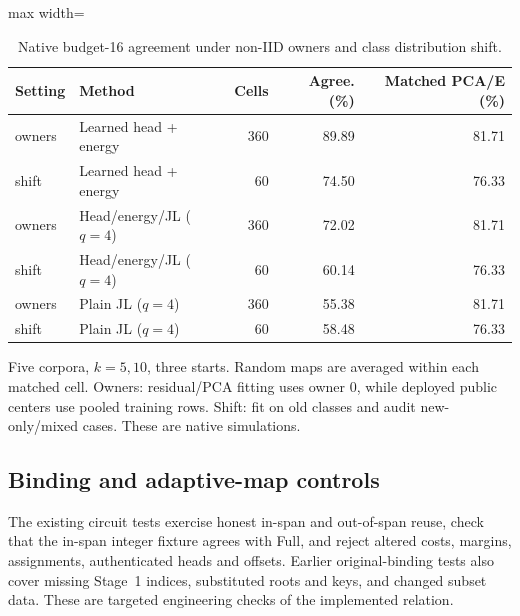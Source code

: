 \documentclass[5p,times,twocolumn]{elsarticle}
\theoremstyle{plain}
\theoremstyle{definition}
\theoremstyle{remark}
\begin{document}
\par\endgroup
\begingroup\color{RevisionGreen}
\begin{table}[tp]\color{RevisionGreen}
\caption{Native budget-16 agreement under non-IID owners and class distribution shift.}\label{tab:reuse-shift}
\centering\small
\begin{adjustbox}{max width=\textwidth}
\begin{tabular}{@{}llrrr@{}}
\toprule
Setting & Method & Cells & Agree. (\%) & Matched PCA/E (\%) \\
\midrule
owners & Learned head + energy & 360 & 89.89 & 81.71 \\
shift & Learned head + energy & 60 & 74.50 & 76.33 \\
owners & Head/energy/JL ($q=4$) & 360 & 72.02 & 81.71 \\
shift & Head/energy/JL ($q=4$) & 60 & 60.14 & 76.33 \\
owners & Plain JL ($q=4$) & 360 & 55.38 & 81.71 \\
shift & Plain JL ($q=4$) & 60 & 58.48 & 76.33 \\
\bottomrule
\end{tabular}
\end{adjustbox}
\par\smallskip\begin{minipage}{0.98\textwidth}\footnotesize Five corpora, $k=5,10$, three starts. Random maps are averaged within each matched cell. Owners: residual/PCA fitting uses owner 0, while deployed public centers use pooled training rows. Shift: fit on old classes and audit new-only/mixed cases. These are native simulations.\end{minipage}
\end{table}


\par\endgroup


\subsection{\textcolor{RevisionGreen}{Binding and adaptive-map controls}}
\begingroup\color{RevisionGreen}
The existing circuit tests exercise honest in-span and out-of-span reuse, check that the in-span integer fixture agrees with Full, and reject altered costs, margins, assignments, authenticated heads and offsets. Earlier original-binding tests also cover missing Stage~1 indices, substituted roots and keys, and changed subset data. These are targeted engineering checks of the implemented relation.
\end{document}
